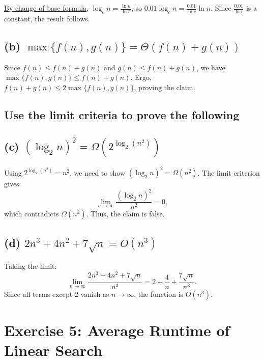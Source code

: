 \documentclass[9pt]{article}
\begin{document}
\href{https://www.youtube.com/watch?v=FFm-zaFW_X4}{By change of base formula}, \( \log_c n = \frac{\ln n}{\ln c} \), so \( 0.01 \log_c n = \frac{0.01}{\ln c} \ln n \). Since \( \frac{0.01}{\ln c} \) is a constant, the result follows.

\subsection*{(b) \( \max\{f(n), g(n)\} = \Theta(f(n) + g(n)) \)}
Since \( f(n) \leq f(n) + g(n) \) and \( g(n) \leq f(n) + g(n) \), we have \( \max\{f(n), g(n)\} \leq f(n) + g(n) \). Ergo, \( f(n) + g(n) \leq 2 \max\{f(n), g(n)\} \), proving the claim.

\subsection*{Use the limit criteria to prove the following}

\subsection*{(c) \( (\log_2 n)^2 = \Omega(2^{\log_2 (n^2)}) \)}
Using \( 2^{\log_2 (n^2)} = n^2 \), we need to show \( (\log_2 n)^2 = \Omega(n^2) \). The limit criterion gives:
\[ \lim_{n \to \infty} \frac{(\log_2 n)^2}{n^2} = 0, \]
which contradicts \( \Omega(n^2) \). Thus, the claim is false.

\subsection*{(d) \( 2n^3 + 4n^2 + 7\sqrt{n} = O(n^3) \)}
Taking the limit:
\[ \lim_{n \to \infty} \frac{2n^3 + 4n^2 + 7\sqrt{n}}{n^3} = 2 + \frac{4}{n} + \frac{7\sqrt{n}}{n^3}. \]
Since all terms except 2 vanish as \( n \to \infty \), the function is \( O(n^3) \).

\section*{Exercise 5: Average Runtime of Linear Search}
\end{document}
